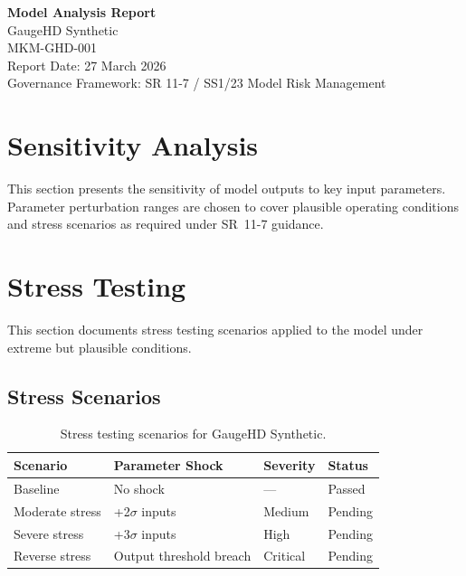 \documentclass[11pt,a4paper]{article}
\begin{document}
\begin{center}
{\Large\textbf{Model Analysis Report}}\\[6pt]
{\large\textcolor{mkmblue}{GaugeHD Synthetic}}\\[4pt]
{\normalsize MKM-GHD-001}\\[12pt]
{\small Report Date: 27 March 2026}\\[4pt]
{\footnotesize Governance Framework: SR 11-7 / SS1/23 Model Risk Management}
\end{center}

\vspace{8mm}
\tableofcontents
\newpage

\section{Sensitivity Analysis}

This section presents the sensitivity of model outputs to key input parameters.
Parameter perturbation ranges are chosen to cover plausible operating conditions
and stress scenarios as required under SR~11-7 guidance.




\section{Stress Testing}

This section documents stress testing scenarios applied to the model
under extreme but plausible conditions.

\subsection{Stress Scenarios}

\begin{table}[H]
    \centering
    \caption{Stress testing scenarios for GaugeHD Synthetic.}
    \begin{tabular}{llll}
        \toprule
        \textbf{Scenario} & \textbf{Parameter Shock} & \textbf{Severity} & \textbf{Status} \\
        \midrule
        Baseline & No shock & --- & Passed \\
        Moderate stress & +2$\sigma$ inputs & Medium & Pending \\
        Severe stress & +3$\sigma$ inputs & High & Pending \\
        Reverse stress & Output threshold breach & Critical & Pending \\
        \bottomrule
    \end{tabular}
\end{table}
\end{document}
